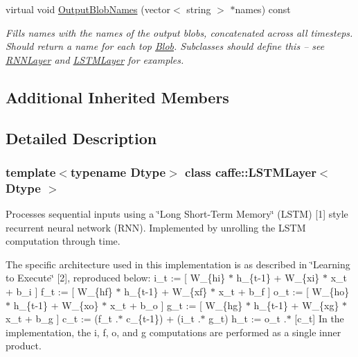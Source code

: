\begin{DoxyCompactItemize}
virtual void \mbox{\hyperlink{classcaffe_1_1_l_s_t_m_layer_a51f73c86adfb8eface5aa9dce3d8ba66}{Output\+Blob\+Names}} (vector$<$ string $>$ $\ast$names) const
\begin{DoxyCompactList}\small\item\em Fills names with the names of the output blobs, concatenated across all timesteps. Should return a name for each top \mbox{\hyperlink{classcaffe_1_1_blob}{Blob}}. Subclasses should define this -- see \mbox{\hyperlink{classcaffe_1_1_r_n_n_layer}{R\+N\+N\+Layer}} and \mbox{\hyperlink{classcaffe_1_1_l_s_t_m_layer}{L\+S\+T\+M\+Layer}} for examples. \end{DoxyCompactList}\end{DoxyCompactItemize}
\subsection*{Additional Inherited Members}


\subsection{Detailed Description}
\subsubsection*{template$<$typename Dtype$>$\newline
class caffe\+::\+L\+S\+T\+M\+Layer$<$ Dtype $>$}

Processes sequential inputs using a \char`\"{}\+Long Short-\/\+Term Memory\char`\"{} (L\+S\+TM) \mbox{[}1\mbox{]} style recurrent neural network (R\+NN). Implemented by unrolling the L\+S\+TM computation through time. 

The specific architecture used in this implementation is as described in \char`\"{}\+Learning to Execute\char`\"{} \mbox{[}2\mbox{]}, reproduced below\+: i\+\_\+t \+:= \mbox{[} W\+\_\+\{hi\} $\ast$ h\+\_\+\{t-\/1\} + W\+\_\+\{xi\} $\ast$ x\+\_\+t + b\+\_\+i \mbox{]} f\+\_\+t \+:= \mbox{[} W\+\_\+\{hf\} $\ast$ h\+\_\+\{t-\/1\} + W\+\_\+\{xf\} $\ast$ x\+\_\+t + b\+\_\+f \mbox{]} o\+\_\+t \+:= \mbox{[} W\+\_\+\{ho\} $\ast$ h\+\_\+\{t-\/1\} + W\+\_\+\{xo\} $\ast$ x\+\_\+t + b\+\_\+o \mbox{]} g\+\_\+t \+:= \mbox{[} W\+\_\+\{hg\} $\ast$ h\+\_\+\{t-\/1\} + W\+\_\+\{xg\} $\ast$ x\+\_\+t + b\+\_\+g \mbox{]} c\+\_\+t \+:= (f\+\_\+t .$\ast$ c\+\_\+\{t-\/1\}) + (i\+\_\+t .$\ast$ g\+\_\+t) h\+\_\+t \+:= o\+\_\+t .$\ast$ \mbox{[}c\+\_\+t\mbox{]} In the implementation, the i, f, o, and g computations are performed as a single inner product.

